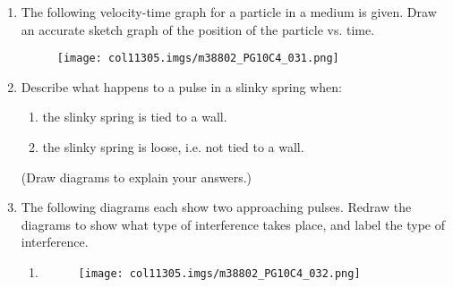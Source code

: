\begin{enumerate}[noitemsep, label=\textbf{\arabic*}. ]
\begin{figure}[H]
\begin{center}
    \vspace{.1in}
    \end{center}
 \end{figure}               \label{m38802*uid75}\item The following velocity-time graph for a particle in a medium is given. Draw an accurate sketch graph of the position of the particle vs. time.
    \setcounter{subfigure}{0}
	\begin{figure}[H] %
    \begin{center}
    \label{m38802*id316826!!!underscore!!!media}\label{m38802*id316826!!!underscore!!!printimage}\texttt{[image: col11305.imgs/m38802\_PG10C4\_031.png]} %
      \vspace{2pt}
    \vspace{.1in}
    \end{center}
 \end{figure}               \label{m38802*uid76}\item Describe what happens to a pulse in a slinky spring when:
\label{m38802*id316845}\begin{enumerate}[noitemsep, label=\textbf{\alph*}. ] 
            \label{m38802*uid77}\item the slinky spring is tied to a wall.
\label{m38802*uid78}\item the slinky spring is loose, i.e. not tied to a wall.
\end{enumerate}
(Draw diagrams to explain your answers.)\newline
\label{m38802*uid79}\item The following diagrams each show two approaching pulses. Redraw the diagrams to show what type of interference takes place, and label the type of interference.
\label{m38802*id316891}\begin{enumerate}[noitemsep, label=\textbf{\alph*}. ] 
            \label{m38802*uid80}\item 
    \setcounter{subfigure}{0}
	\begin{figure}[H] %
    \begin{center}
    \label{m38802*id316905!!!underscore!!!media}\label{m38802*id316905!!!underscore!!!printimage}\texttt{[image: col11305.imgs/m38802\_PG10C4\_032.png]} %
      \vspace{2pt}
    \vspace{.1in}
    \end{center}

\end{figure}
\end{enumerate}
\end{enumerate}
